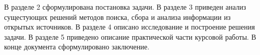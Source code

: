 \par
В разделе 2 сформулирована постановка задачи. 
В разделе 3 приведен анализ сущестующих решений методов поиска, сбора и анализа информации из открытых источников. 
В разделе 4 описано исследование и построение решения задачи. 
В разделе 5 приведено описание практической части курсовой работы. 
В конце документа сформулировано заключение.
